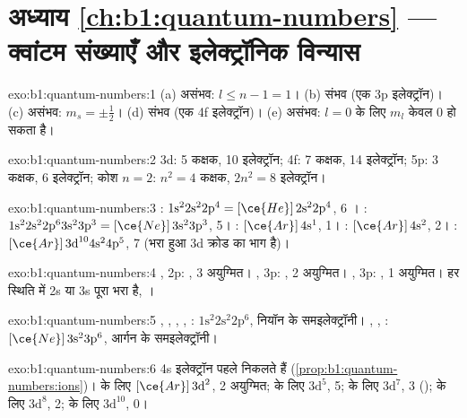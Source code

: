 \section*{अध्याय \ref{ch:b1:quantum-numbers} --- क्वांटम संख्याएँ और इलेक्ट्रॉनिक विन्यास}

\begin{solution}{exo:b1:quantum-numbers:1}
(a) असंभव: $l \le n - 1 = 1$। (b) संभव (एक 3p इलेक्ट्रॉन)।
(c) असंभव: $m_s = \pm\tfrac12$। (d) संभव (एक 4f इलेक्ट्रॉन)।
(e) असंभव: $l = 0$ के लिए $m_l$ केवल 0 हो सकता है।
\end{solution}

\begin{solution}{exo:b1:quantum-numbers:2}
3d: 5 कक्षक, 10 इलेक्ट्रॉन; 4f: 7 कक्षक, 14 इलेक्ट्रॉन; 5p: 3
कक्षक, 6 इलेक्ट्रॉन; कोश $n = 2$: $n^2 = 4$ कक्षक, $2n^2 = 8$
इलेक्ट्रॉन।
\end{solution}

\begin{solution}{exo:b1:quantum-numbers:3}
: $1\text{s}^2 2\text{s}^2 2\text{p}^4 = [\ce{He}]\,2\text{s}^2 2\text{p}^4$,
6 । : $1\text{s}^2 2\text{s}^2 2\text{p}^6 3\text{s}^2
3\text{p}^3 = [\ce{Ne}]\,3\text{s}^2 3\text{p}^3$, 5। : $[\ce{Ar}]\,4\text{s}^1$,
1। : $[\ce{Ar}]\,4\text{s}^2$, 2। : $[\ce{Ar}]\,3\text{d}^{10}
4\text{s}^2 4\text{p}^5$, 7 (भरा हुआ 3d क्रोड का भाग है)।
\end{solution}

\begin{solution}{exo:b1:quantum-numbers:4}
, 2p: , 3 अयुग्मित। , 3p: , 2
अयुग्मित। , 3p: , 1 अयुग्मित। हर स्थिति में 2s या
3s पूरा भरा है, ।
\end{solution}

\begin{solution}{exo:b1:quantum-numbers:5}
, , , , : $1\text{s}^2
2\text{s}^2 2\text{p}^6$, नियॉन के समइलेक्ट्रॉनी। , ,
: $[\ce{Ne}]\,3\text{s}^2 3\text{p}^6$, आर्गन के
समइलेक्ट्रॉनी।
\end{solution}

\begin{solution}{exo:b1:quantum-numbers:6}
4s इलेक्ट्रॉन पहले निकलते हैं (\cref{prop:b1:quantum-numbers:ions})।
 के लिए $[\ce{Ar}]\,3\text{d}^2$, 2 अयुग्मित;  के लिए
$3\text{d}^5$, 5;  के लिए $3\text{d}^7$, 3 ();
 के लिए $3\text{d}^8$, 2;  के लिए $3\text{d}^{10}$, 0।
\end{solution}


